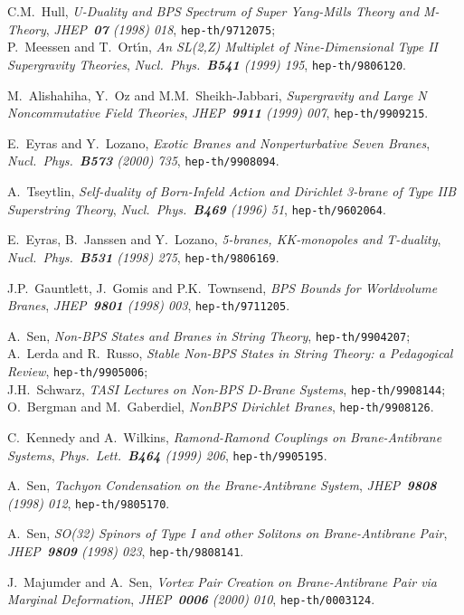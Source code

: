 \documentclass[12pt,a4paper]{article}
\begin{document}
\begin{thebibliography}{99}
C.M.~Hull, {\sl U-Duality and BPS Spectrum of Super Yang-Mills
Theory and M-Theory}, {\it JHEP~{\bf 07} (1998) 018},
{\tt hep-th/9712075};\\
P.~Meessen and T.~Ort\'{\i}n, {\sl An SL(2,Z) Multiplet of Nine-Dimensional
Type II Supergravity Theories}, {\it Nucl.~Phys.~{\bf B541} (1999) 195},
{\tt hep-th/9806120}.

M.~Alishahiha, Y.~Oz and M.M.~Sheikh-Jabbari, {\sl Supergravity and
Large N Noncommutative Field Theories}, {\it JHEP~{\bf 9911} (1999) 007},
{\tt hep-th/9909215}.

E.~Eyras and Y.~Lozano,
{\sl Exotic Branes and Nonperturbative Seven Branes},
{\it Nucl.~Phys.~{\bf B573} (2000) 735},
{\tt hep-th/9908094}.

A.~Tseytlin, {\sl Self-duality of Born-Infeld Action and
Dirichlet 3-brane of Type IIB Superstring Theory},
{\it Nucl.~Phys.~{\bf B469} (1996) 51},
{\tt hep-th/9602064}.

E.~Eyras, B.~Janssen and Y.~Lozano,
{\sl 5-branes, KK-monopoles and T-duality},
{\it Nucl.~Phys.~{\bf B531} (1998) 275},
{\tt hep-th/9806169}.

J.P.~Gauntlett, J.~Gomis and P.K.~Townsend, {\sl BPS Bounds for
Worldvolume Branes}, 
{\sl JHEP~{\bf 9801} (1998) 003}, {\tt hep-th/9711205}.

A.~Sen, {\sl Non-BPS States and Branes in String Theory},
{\tt hep-th/9904207}; \\
A.~Lerda and R.~Russo, {\sl Stable Non-BPS States in String Theory: a
Pedagogical Review}, {\tt hep-th/9905006}; \\
J.H.~Schwarz, {\sl TASI Lectures on Non-BPS D-Brane Systems},
{\tt hep-th/9908144}; \\
O.~Bergman and M.~Gaberdiel, {\sl NonBPS Dirichlet Branes},
{\tt hep-th/9908126}.

C.~Kennedy and A.~Wilkins, {\sl Ramond-Ramond Couplings on 
Brane-Antibrane Systems}, {\it Phys.~Lett.~{\bf B464} (1999) 206},
{\tt hep-th/9905195}.

A.~Sen, {\sl Tachyon Condensation on the Brane-Antibrane System},
{\it JHEP~{\bf 9808} (1998) 012}, {\tt hep-th/9805170}.

A.~Sen, {\sl SO(32) Spinors of Type I and other Solitons on
Brane-Antibrane Pair}, {\it JHEP~{\bf 9809} (1998) 023},
{\tt hep-th/9808141}.

J.~Majumder and A.~Sen, {\sl Vortex Pair Creation on Brane-Antibrane
Pair via Marginal Deformation}, {\it JHEP~{\bf 0006} (2000) 010},
{\tt hep-th/0003124}.


\end{thebibliography}
\end{document}
